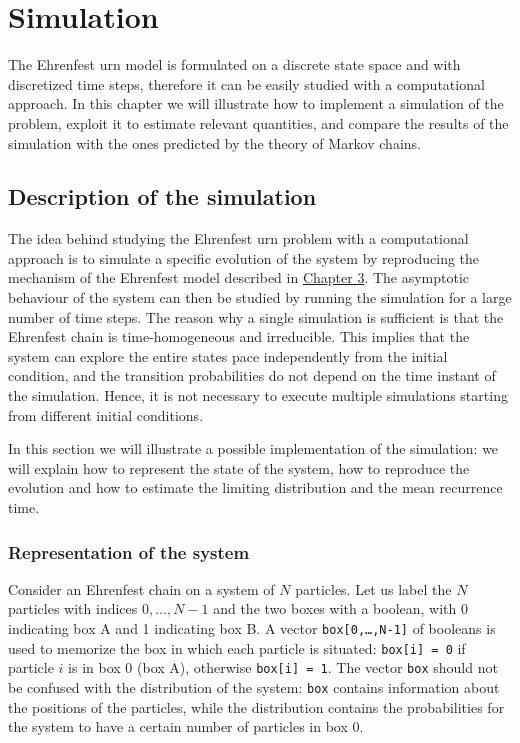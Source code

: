 \chapter{Simulation}
The Ehrenfest urn model is formulated on a discrete state space and with discretized time steps, therefore it can be easily studied with a computational approach. In this chapter we will illustrate how to implement a simulation of the problem, exploit it to estimate relevant quantities, and compare the results of the simulation with the ones predicted by the theory of Markov chains.

\section{Description of the simulation}
The idea behind studying the Ehrenfest urn problem with a computational approach is to simulate a specific evolution of the system by reproducing the mechanism of the Ehrenfest model described in \hyperref[ch:3]{Chapter 3}. The asymptotic behaviour of the system can then be studied by running the simulation for a large number of time steps. The reason why a single simulation is sufficient is that the Ehrenfest chain is time-homogeneous and irreducible. This implies that the system can explore the entire states pace independently from the initial condition, and the transition probabilities do not depend on the time instant of the simulation. Hence, it is not necessary to execute multiple simulations starting from different initial conditions.

In this section we will illustrate a possible implementation of the simulation: we will explain how to represent the state of the system, how to reproduce the evolution and how to estimate the limiting distribution and the mean recurrence time.

\subsection{Representation of the system}
Consider an Ehrenfest chain on a system of $N$ particles. Let us label the $N$ particles with indices $0, \dots,N-1$ and the two boxes with a boolean, with 0 indicating box A and 1 indicating box B. A vector \texttt{box[0,\dots,N-1]} of booleans is used to memorize the box in which each particle is situated: \texttt{box[i] = 0} if particle $i$ is in box 0 (\ie box A), otherwise \texttt{box[i] = 1}. The vector \texttt{box} should not be confused with the distribution of the system: \texttt{box} contains information about the positions of the particles, while the distribution contains the probabilities for the system to have a certain number of particles in box 0.

